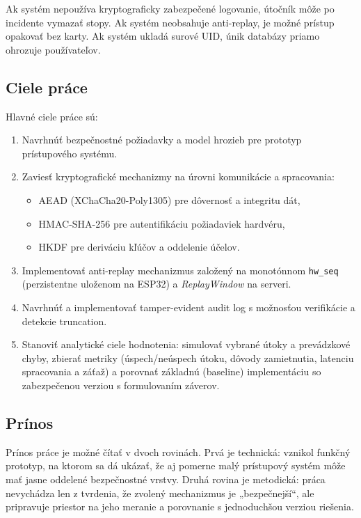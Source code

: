 \documentclass[journal,a4paper,onecolumn]{IEEEtran}
\begin{document}
Ak systém nepoužíva kryptograficky zabezpečené logovanie, útočník môže po incidente vymazať stopy. Ak systém neobsahuje anti-replay, je možné prístup opakovať bez karty. Ak systém ukladá surové UID, únik databázy priamo ohrozuje používateľov.

\subsection{Ciele práce}

Hlavné ciele práce sú:

\begin{enumerate}[leftmargin=*,itemsep=2pt]
  \item Navrhnúť bezpečnostné požiadavky a model hrozieb pre prototyp prístupového systému.
  \item Zaviesť kryptografické mechanizmy na úrovni komunikácie a spracovania:
  \begin{itemize}[leftmargin=*,itemsep=2pt]
    \item AEAD (XChaCha20-Poly1305) pre dôvernosť a integritu dát\cite{RFC8439,XChaChaDraft},
    \item HMAC-SHA-256 pre autentifikáciu požiadaviek hardvéru\cite{FIPS1981},
    \item HKDF pre deriváciu kľúčov a oddelenie účelov\cite{RFC5869}.
  \end{itemize}
  \item Implementovať anti-replay mechanizmus založený na monotónnom \texttt{hw\_seq} (perzistentne uloženom na ESP32) a \emph{ReplayWindow} na serveri.
  \item Navrhnúť a implementovať tamper-evident audit log s možnosťou verifikácie a detekcie truncation.
  \item Stanoviť analytické ciele hodnotenia: simulovať vybrané útoky a prevádzkové chyby, zbierať metriky (úspech/neúspech útoku, dôvody zamietnutia, latenciu spracovania a záťaž) a porovnať základnú (baseline) implementáciu so zabezpečenou verziou s formulovaním záverov.
\end{enumerate}

\subsection{Prínos}

Prínos práce je možné čítať v dvoch rovinách. Prvá je technická: vznikol funkčný prototyp, na ktorom sa dá ukázať, že aj pomerne malý prístupový systém môže mať jasne oddelené bezpečnostné vrstvy. Druhá rovina je metodická: práca nevychádza len z tvrdenia, že zvolený mechanizmus je „bezpečnejší“, ale pripravuje priestor na jeho meranie a porovnanie s jednoduchšou verziou riešenia.
\end{document}

